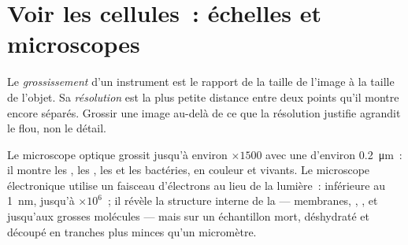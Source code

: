 \section{Voir les cellules~: échelles et microscopes}

\begin{definition}\label{def:g10:cells-common-unit:magnification}
Le \emph{grossissement} d'un instrument est le
rapport de la taille de l'image à la taille de l'objet. Sa
\emph{résolution} est la plus petite distance entre
deux points qu'il montre encore séparés. Grossir une image au-delà de
ce que la résolution justifie agrandit le flou, non le détail.
\end{definition}

\begin{proposition}\label{prop:g10:cells-common-unit:microscopes}
Le microscope optique grossit jusqu'à environ $\times 1500$ avec une
 d'environ \qty{0.2}{\micro m}~: il montre les , les
, les  et les bactéries, en couleur et vivants. Le
microscope électronique utilise un faisceau d'électrons au lieu de la
lumière~:  inférieure au \qty{1}{nm},  jusqu'à
$\times 10^6$~; il révèle la structure interne de la  ---
membranes, , , et jusqu'aux grosses molécules ---
mais sur un échantillon mort, déshydraté et découpé en tranches plus
minces qu'un micromètre.
\end{proposition}
\admitted


